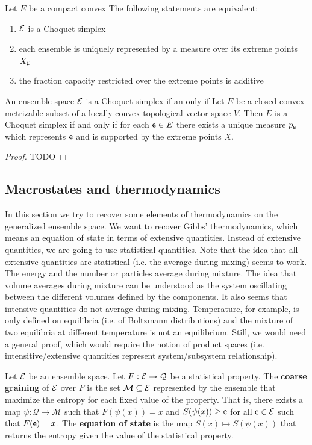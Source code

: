 \begin{prop}
	Let $E$ be a compact convex The following statements are equivalent:
	\begin{enumerate}
		\item $\mathcal{E}$ is a Choquet simplex
		\item each ensemble is uniquely represented by a measure over its extreme points $X_{\mathcal{E}}$
		\item the fraction capacity restricted over the extreme points is additive
	\end{enumerate}
	
	An ensemble space $\mathcal{E}$ is a Choquet simplex if an only if Let $E$ be a closed convex metrizable subset of a locally convex topological vector space $V$. Then $E$ is a Choquet simplex if and only if for each $\mathsf{e} \in E$ there exists a unique measure $p_{\mathsf{e}}$ which represents $\mathsf{e}$ and is supported by the extreme points $X$.
\end{prop}

\begin{proof}
	TODO
\end{proof}


\subsection{Macrostates and thermodynamics}

In this section we try to recover some elements of thermodynamics on the generalized ensemble space. We want to recover Gibbs' thermodynamics, which means an equation of state in terms of extensive quantities. Instead of extensive quantities, we are going to use statistical quantities. Note that the idea that all extensive quantities are statistical (i.e. the average during mixing) seems to work. The energy and the number or particles average during mixture. The idea that volume averages during mixture can be understood as the system oscillating between the different volumes defined by the components. It also seems that intensive quantities do not average during mixing. Temperature, for example, is only defined on equilibria (i.e. of Boltzmann distributions) and the mixture of two equilibria at different temperature is not an equilibrium. Still, we would need a general proof, which would require the notion of product spaces (i.e. intensitive/extensive quantities represent system/subsystem relationship).

\begin{defn}
	Let $\mathcal{E}$ be an ensemble space. Let $F : \mathcal{E} \to \mathcal{Q}$ be a statistical property. The \textbf{coarse graining} of $\mathcal{E}$ over $F$ is the set $\mathcal{M} \subseteq \mathcal{E}$ represented by the ensemble that maximize the entropy for each fixed value of the property. That is, there exists a map $\psi : \mathcal{Q} \to \mathcal{M}$ such that $F(\psi(x)) = x$ and $S(\psi(x)) \geq \mathsf{e}$ for all $\mathsf{e} \in \mathcal{E}$ such that $F(\mathsf{e}) = x$. The \textbf{equation of state} is the map $S(x) \mapsto S(\psi(x))$ that returns the entropy given the value of the statistical property.
\end{defn}

